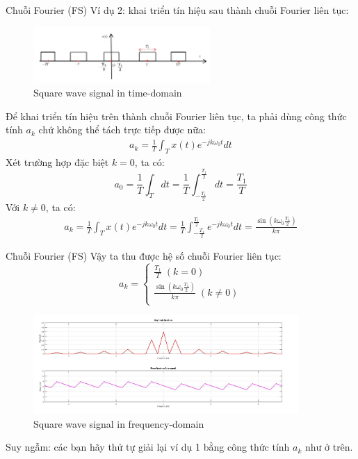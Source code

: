 \documentclass[8pt]{beamer}
\begin{document}
\begin{frame}{Chuỗi Fourier (FS)}
Ví dụ 2: khai triển tín hiệu sau thành chuỗi Fourier liên tục:
\begin{figure}[h]
			\includegraphics[width=0.6\textwidth]{square.jpg}
			\caption{Square wave signal in time-domain}\label{fig:re11}

		\end{figure}
		Để khai triển tín hiệu trên thành chuỗi Fourier liên tục, ta phải dùng công thức tính $a_{k}$ chứ không thể tách trực tiếp được nữa:
\begin{equation*}
\begin{split}
a_{k}=\frac{1}{T}\int_{T}x(t)e^{-jk\omega_{0}t}dt
\end{split}
\end{equation*}
Xét trường hợp đặc biệt $k=0$, ta có: $$a_{0}=\frac{1}{T}\int_{T}dt=\frac{1}{T}\int_{-\frac{T_{1}}{2}}^{\frac{T_{1}}{2}}dt=\frac{T_{1}}{T}$$
Với $k\neq 0$, ta có:
\begin{equation*}
	\begin{split}
		a_{k}=\frac{1}{T}\int_{T}x(t)e^{-jk\omega_{0}t}dt=\frac{1}{T}\int_{-\frac{T_{1}}{2}}^{\frac{T_{1}}{2}}e^{-jk\omega_{0}t}dt=\frac{\sin{\left(k\omega_{0}\frac{T_{1}}{2}\right)}}{k\pi}
\end{split}
\end{equation*}
\end{frame}
\begin{frame}{Chuỗi Fourier (FS)}
Vậy ta thu được hệ số chuỗi Fourier liên tục:
\begin{equation*}
	a_{k}=
	\begin{cases}
		\frac{T_{1}}{T} \; (k=0)\\
		\frac{\sin{\left(k\omega_{0}\frac{T_{1}}{2}\right)}}{k\pi} \;(k\neq0)\\

	\end{cases}
\end{equation*}
\begin{figure}[h]
			\includegraphics[width=0.9\textwidth]{s.jpg}
			\caption{Square wave signal in frequency-domain}\label{fig:re11}

		\end{figure}
	Suy ngẫm: các bạn hãy thử tự giải lại ví dụ 1 bằng công thức tính $a_{k}$ như ở trên.
\end{frame}
\end{document}
